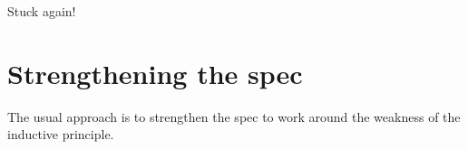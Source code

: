 \documentclass[a4paper]{article}
\begin{document}
Stuck again!

\begin{alectryon}
  \begin{\al{sentence}}
    \begin{\al{input}}
    \end{\al{input}}
  \end{\al{sentence}}
\end{alectryon}


\section{Strengthening the spec%
  \label{strengthening-the-spec}%
}

The usual approach is to strengthen the spec to work around the weakness of the inductive principle.
\end{document}
